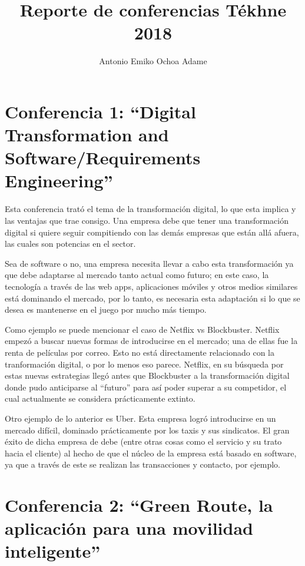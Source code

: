 \documentclass{article}
\title{Reporte de conferencias Tékhne 2018}
\author{Antonio Emiko Ochoa Adame}
\begin{document}
\maketitle

\section{Conferencia 1: ``Digital Transformation and Software/Requirements  Engineering''}
Esta conferencia trató el tema de la transformación digital, lo que esta implica y las ventajas que trae consigo. Una empresa debe que tener una transformación digital si quiere seguir compitiendo con las demás empresas que están allá afuera, las cuales son potencias en el sector.

Sea de software o no, una empresa necesita llevar a cabo esta transformación ya que debe adaptarse al mercado tanto actual como futuro; en este caso, la tecnología a través de las web apps, aplicaciones móviles y otros medios similares está dominando el mercado, por lo tanto, es necesaria esta adaptación si lo que se desea es mantenerse en el juego por mucho más tiempo.

Como ejemplo se puede mencionar el caso de Netflix vs Blockbuster. Netflix empezó a buscar nuevas formas de introducirse en el mercado; una de ellas fue la renta de películas por correo. Esto no está directamente relacionado con la tranformación digital, o por lo menos eso parece. Netflix, en su búsqueda por estas nuevas estrategias llegó antes que Blockbuster a la transformación digital donde pudo anticiparse al ``futuro'' para así poder superar a su competidor, el cual actualmente se considera prácticamente extinto.

Otro ejemplo de lo anterior es Uber. Esta empresa logró introducirse en un mercado difícil, dominado prácticamente por los taxis y sus sindicatos. El gran éxito de dicha empresa de debe (entre otras cosas como el servicio y su trato hacia el cliente) al hecho de que el núcleo de la empresa está basado en software, ya que a través de este se realizan las transacciones y contacto, por ejemplo.

\section{Conferencia 2: ``Green Route, la aplicación para una movilidad inteligente''}
\end{document}

